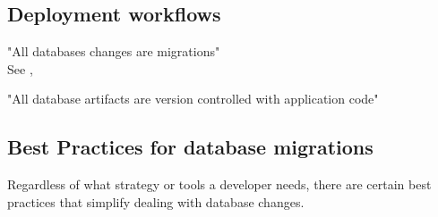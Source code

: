 \subsection{Deployment workflows}
"All databases changes are migrations" \cite{Robles2021}\\
See \cite{Piairo2018}, \cite{Sadalage2016}

%
"All database artifacts are version controlled with application code"

%

%


\subsection{Best Practices for database migrations}%
%

Regardless of what strategy or tools a developer needs, there are certain best practices that simplify dealing with database changes.

